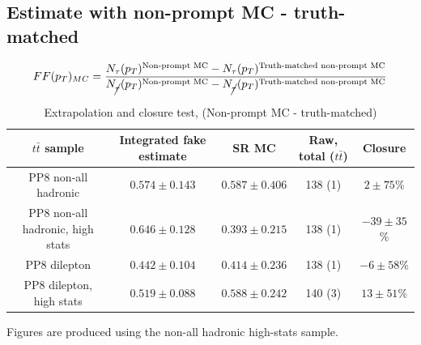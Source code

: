 \documentclass[11pt]{article}
\begin{document}
			
		
		
	\clearpage
	\subsection{Estimate with non-prompt MC - truth-matched} 
	\begin{equation}
		FF(p_T)_{MC} = \frac{N_\tau (p_T)^{\text{Non-prompt MC}} - N_\tau (p_T)^{\text{Truth-matched non-prompt MC}}}{N_{\cancel{\tau}} (p_T)^{\text{Non-prompt MC}} - N_{\cancel{\tau}} (p_T)^{\text{Truth-matched non-prompt MC}}}
	\end{equation}

	\begin{table}[htp]
	\caption{Extrapolation and closure test, (Non-prompt MC - truth-matched)}
	\begin{center}
	\begin{tabular}{|c|c|c|c|c|}
	\hline
	$t\bar{t}$ sample 	& Integrated fake estimate	& SR MC		&  	Raw, total ($t\bar{t}$) 	& Closure \\
	\hline
	PP8 non-all hadronic			& 	$0.574\pm0.143$ 		& $0.587\pm0.406$ 		& 138 (1)	&  $2\pm75$\% \\
	PP8 non-all hadronic, high stats	& 	$0.646\pm0.128$ 		& $0.393\pm0.215$ 		& 138 (1)	&  $-39\pm35$\% \\
	PP8 dilepton 					& 	$0.442\pm0.104$ 		& $0.414\pm0.236$ 		& 138 (1)	&  $-6\pm58$\% \\
	PP8 dilepton, high stats			& 	$0.519\pm0.088$ 		& $0.588\pm0.242$ 		& 140 (3)	&  $13\pm51$\% \\
	\hline
	\end{tabular}
	\end{center}
	\label{default}
	\end{table}%
		
	Figures are produced using the non-all hadronic high-stats sample. 
		
\end{document}
